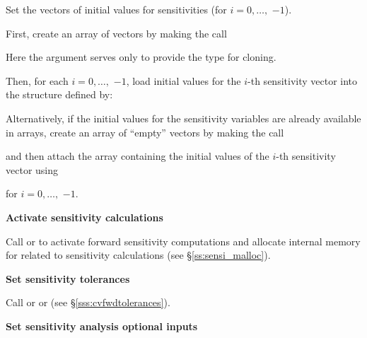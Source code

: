 \begin{Steps}
  Set the  vectors  of initial values
  for sensitivities (for $i=0,\ldots,$  $ - 1$). 

  First, create an array of  vectors by making the call

  {\s} 

  {\p} 

  Here the argument  serves only to provide the  type for cloning.

  Then, for each $i = 0,\ldots, $ $ - 1$, load initial values
  for the $i$-th sensitivity vector into the structure defined by:

  {\s} 

  {\p} 

  Alternatively, if the initial values for the sensitivity variables
  are already available in  arrays, create an array of
   ``empty'' vectors by making the call

  {\s} 

  {\p} 

  and then attach the  array  containing the
  initial values of the $i$-th sensitivity vector using

  {\s} 
  
  {\p} 

  for $i = 0,\ldots, $ $ - 1$.
  
\item
  {\bf Activate sensitivity calculations}

  Call  or  to activate forward 
  sensitivity computations and allocate internal memory for {\cvodes} related 
  to sensitivity calculations (see \S\ref{ss:sensi_malloc}).

\item
  {\bf Set sensitivity tolerances}

  Call  or  or
   (see \S\ref{sss:cvfwdtolerances}).

\item
  {\bf Set sensitivity analysis optional inputs}


\end{Steps}
